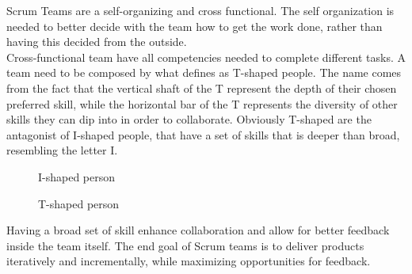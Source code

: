 \documentclass[../main.tex]{subfiles}
\begin{document}
Scrum Teams are a self-organizing and cross functional. The self organization is needed to better decide with the team how to get the work done, rather than having this decided from the outside.\\
Cross-functional team have all competencies needed to complete different tasks. A team need to be composed by what \citeauthor{Scrumastery} \cite{Scrumastery} defines as T-shaped people. The name comes from the fact that the vertical shaft of the T represent the depth of their chosen preferred skill, while the horizontal bar of the T represents the diversity of other skills they can dip into in order to collaborate. Obviously T-shaped are the antagonist of I-shaped people, that have a set of skills that is deeper than broad, resembling the letter I.\\
\begin{figure}[H]
\centering
\begin{minipage}{.5\textwidth}
  \centering

  \caption{I-shaped person}
\end{minipage}%
\begin{minipage}{.5\textwidth}
  \centering
{} %
  \caption{T-shaped person}
\end{minipage}
\end{figure}
Having a broad set of skill enhance collaboration and allow for better feedback inside the team itself. The end goal of Scrum teams is to deliver products iteratively and incrementally, while maximizing opportunities for feedback.
\end{document}
